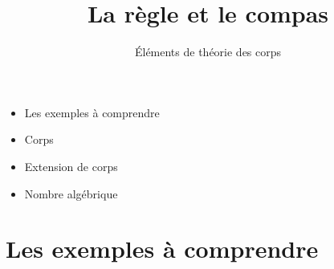 


\newcommand{\construc}{\mathcal{C}}
\newcommand{\plan}{\mathcal{P}}
\newcommand{\cercle}{\mathcal{C}}
   





\title{{\bf La règle et le compas}}
\subtitle{\'Eléments de théorie des corps}

\begin{frame}
  
  \debutmontitre

  \pause

{\footnotesize
\hfill
{}
\begin{minipage}{0.6\textwidth}
  \begin{itemize}
    \item<3-> Les exemples à comprendre
    \item<4-> Corps
    \item<5-> Extension de corps
    \item<6-> Nombre algébrique
  \end{itemize}
\end{minipage}
}

\end{frame}

\setcounter{framenumber}{0}


\section{Les exemples à comprendre}

